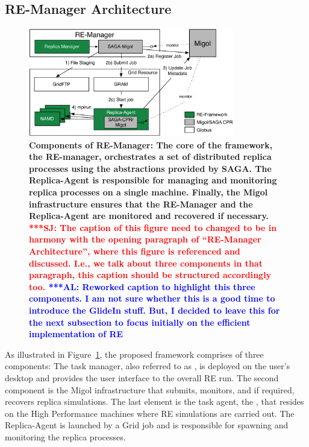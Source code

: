 \documentclass{rspublic}
\newcommand{\alnote}[1]{ {\textcolor{blue} { ***AL: #1 }}}
\newcommand{\jhanote}[1]{ {\textcolor{red} { ***SJ: #1 }}}
\newcommand{\alnote}[1]{}
\newcommand{\jhanote}[1]{}
\newcommand{\replicaagent}[1]{Replica-Agent }
\newcommand{\remanager}[1]{RE-Manager }
\begin{document}
\subsection{RE-Manager Architecture}
\begin{figure}[t]
      \centering
          \includegraphics[width=0.8\textwidth]{REMDgManager-architecture.pdf}
          \caption{\footnotesize \bf Components of RE-Manager: The
            core of the framework, the RE-manager, orchestrates 
            a set of distributed replica processes using the abstractions provided
            by SAGA. The Replica-Agent is responsible for managing and monitoring 
            replica processes on a single machine. Finally, the Migol 
            infrastructure ensures that the RE-Manager and the Replica-Agent 
            are monitored and recovered if necessary.            
            \jhanote{The caption of this
              figure need to changed to be in harmony with the opening
              paragraph of ``RE-Manager Architecture'', where this
              figure is referenced and discussed. I.e., we talk about
              three components in that paragraph, this caption should
              be structured accordingly too.}
              \alnote{Reworked caption to highlight this three components. 
              I am not sure whether this is a good time to introduce the GlideIn stuff. But, I 
              decided to leave this for the next subsection to focus initially on
              the efficient implementation of RE}
              }
      \label{fig:REMD-Manager-architecture}
\end{figure}

As illustrated in Figure~\ref{fig:REMD-Manager-architecture}, the
proposed framework comprises of three components: The task manager,
also referred to as \emph{\remanager}, is deployed on the user's
desktop and provides the user interface to the overall RE run. The
second component is the Migol infrastructure that submits, monitors,
and if required, recovers replica simulations.  The last element is
the task agent, the \textit{\replicaagent},
that resides on the High Performance machines where RE simulations
are carried out. The \replicaagent\ is launched by a Grid job and is
responsible for spawning and monitoring the replica processes. 
\end{document}
